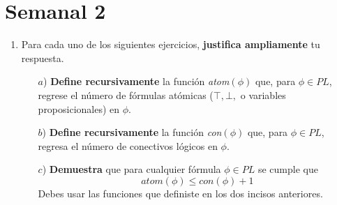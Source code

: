 \documentclass{article}
\begin{document}
\section*{\LARGE{Semanal 2}}
\begin{enumerate}
\item Para cada uno de los siguientes ejercicios, \textbf{justifica ampliamente}
  tu respuesta.
  \begin{itemize}
  \item[$a$)] \textbf{Define recursivamente} la función \textit{atom}$(\phi)$ que,
    para $\phi \in PL$, regrese el número de fórmulas atómicas ($\top, \bot,$ o variables
    proposicionales) en $\phi$.
  \item[$b$)] \textbf{Define recursivamente} la función \textit{con}$(\phi)$ que,
    para $\phi \in PL$, regresa el número de conectivos lógicos en $\phi$.
  \item[$c$)] \textbf{Demuestra} que para cualquier fórmula $\phi \in PL$ se cumple que
    \[
    atom(\phi) \leq con(\phi) + 1
    \]
    Debes usar las funciones que definiste en los dos incisos anteriores.
  \end{itemize}
  

\end{enumerate}
\end{document}
